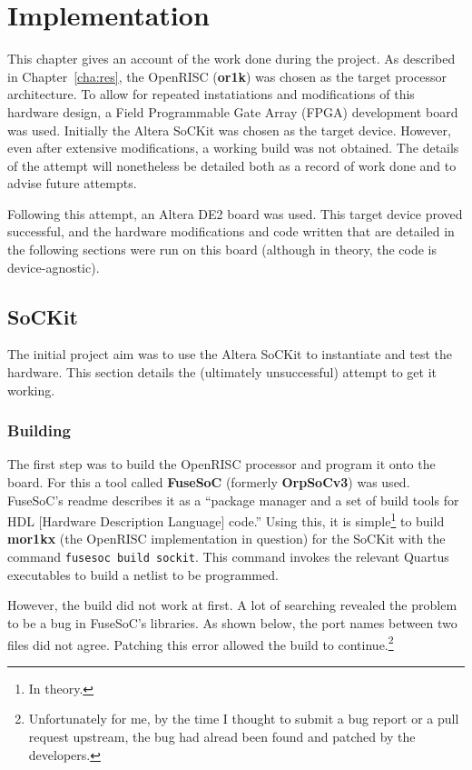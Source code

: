 \chapter{Implementation}
\label{cha:imp}

This chapter gives an account of the work done during the project. As described in Chapter~\ref{cha:res}, the OpenRISC (\textbf{or1k}) was chosen as the target processor architecture. To allow for repeated instatiations and modifications of this hardware design, a Field Programmable Gate Array (FPGA) development board was used. Initially the Altera SoCKit\cite{sockit} was chosen as the target device. However, even after extensive modifications, a working build was not obtained. The details of the attempt will nonetheless be detailed both as a record of work done and to advise future attempts.

Following this attempt, an Altera DE2 board\cite{de2} was used. This target device proved successful, and the hardware modifications and code written that are detailed in the following sections were run on this board (although in theory, the code is device-agnostic).

\section{SoCKit}
\label{sec:sockit}
The initial project aim was to use the Altera SoCKit to instantiate and test the hardware.  This section details the (ultimately unsuccessful) attempt to get it working.

\subsection{Building}
The first step was to build the OpenRISC processor and program it onto the board. For this a tool called \textbf{FuseSoC}\cite{fusesoc} (formerly \textbf{OrpSoCv3}) was used. FuseSoC's readme describes it as a ``package manager and a set of build tools for HDL [Hardware Description Language] code.'' Using this, it is simple\footnote{In theory.} to build \textbf{mor1kx} (the OpenRISC implementation in question) for the SoCKit with the command \texttt{fusesoc build sockit}. This command invokes the relevant Quartus executables to build a netlist to be programmed.

However, the build did not work at first. A lot of searching revealed the problem to be a bug in FuseSoC's libraries. As shown below, the port names between two files did not agree. Patching this error allowed the build to continue.\footnote{Unfortunately for me, by the time I thought to submit a bug report or a pull request upstream, the bug had alread been found and patched by the developers.}

